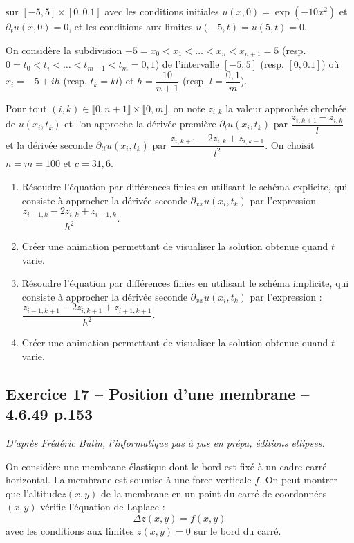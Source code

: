 \documentclass[10pt,fleqn]{article} %
\begin{document}
\begin{multicols}{2}
sur $[-5,5] \times [0,0.1]$ avec les conditions initiales $u(x,0)=\exp\left( {-10 x^2}\right)$ et 
$\partial_t u(x,0)=0$, et les conditions aux limites $u(-5,t)=u(5,t)=0$. 

On considère la subdivision $-5=x_0<x_1<\ldots <x_n <  x_{n+1} =5$ (resp. 
$0=t_0<t_i<\ldots<t_{m-1}<t_m=0,1$) de l'intervalle $[-5,5]$ (resp. $[0,0.1]$) où 
$x_i=-5+ih$ (resp. $t_k=kl$) et $h=\dfrac{10}{n+1}$ (resp. $l=\dfrac{0,1}{m}$).

Pour tout $(i,k) \in \llbracket 0,n+1 \rrbracket \times\llbracket 0,m \rrbracket $, on note $z_{i,k}$ la valeur approchée cherchée de $u\left(x_i,t_k\right)$ et l'on approche la dérivée première 
$\partial_{t} u(x_i,t_k)$ par $\dfrac{z_{i,k+1}-z_{i,k}}{l}$ et la dérivée seconde $\partial_{tt} u(x_i,t_k)$ par $\dfrac{z_{i,k+1}-2z_{i,k}+z_{i,k-1}}{l^2}$. On choisit $n=m=100$ et $c=31,6$.

\begin{enumerate}
\item Résoudre l'équation par différences finies en utilisant le schéma explicite, qui consiste à approcher la dérivée seconde $\partial_{xx} u(x_i,t_k)$ par l'expression $\dfrac{z_{i-1,k}-2z_{i,k}+z_{i+1,k}}{h^2}$.
\item Créer une animation permettant de visualiser la solution obtenue quand $t$ varie. 
\item Résoudre l'équation par différences finies en utilisant le schéma implicite, qui consiste à approcher la dérivée seconde $\partial_{xx} u(x_i,t_k)$ par l'expression :
$\dfrac{z_{i-1,k+1}-2z_{i,k+1}+z_{i+1,k+1}}{h^2}$.
\item Créer une animation permettant de visualiser la solution obtenue quand $t$ varie. 
\end{enumerate}

\subsection*{Exercice 17 -- Position d'une membrane -- 4.6.49 p.153}
\begin{flushright}
\textit{D'après Frédéric Butin, l'informatique pas à pas en prépa, éditions ellipses.}
\end{flushright}

On considère une membrane élastique dont le bord est fixé à un cadre carré horizontal. La membrane est soumise à une force verticale $f$. On peut montrer que l'altitude$z(x,y)$ de la membrane en un point du carré de coordonnées $(x,y)$ vérifie l'équation de Laplace :
$$
\Delta z\left( x,y\right) = f(x,y)
$$
 avec les conditions aux limites $z(x,y)=0$ sur le bord du carré. 
 

\end{multicols}
\end{document}
